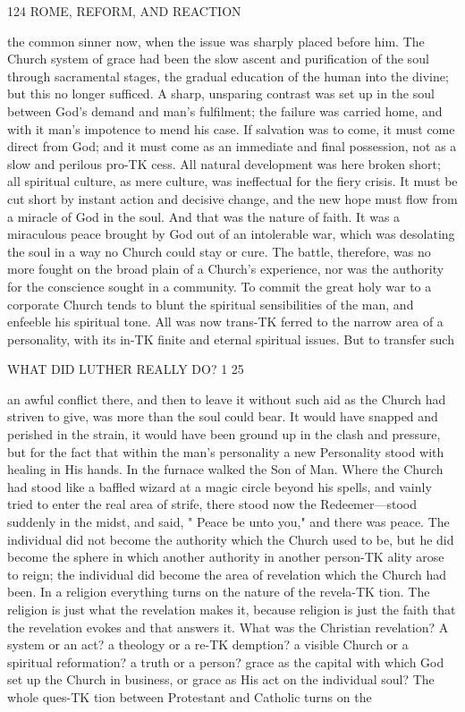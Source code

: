 \documentclass[12pt,a5paper,oneside]{book}
\begin{document}
124 ROME, REFORM, AND REACTION 

the common sinner now, when the issue was sharply 
placed before him. The Church system of grace had 
been the slow ascent and purification of the soul through 
sacramental stages, the gradual education of the human 
into the divine; but this no longer sufficed. A sharp, 
unsparing contrast was set up in the soul between 
God's demand and man's fulfilment; the failure was 
carried home, and with it man's impotence to mend 
his case. If salvation was to come, it must come 
direct from God; and it must come as an immediate 
and final possession, not as a slow and perilous pro-TK
cess. All natural development was here broken short; 
all spiritual culture, as mere culture, was ineffectual 
for the fiery crisis. It must be cut short by instant 
action and decisive change, and the new hope must 
flow from a miracle of God in the soul. And that 
was the nature of faith. It was a miraculous peace 
brought by God out of an intolerable war, which was 
desolating the soul in a way no Church could stay or 
cure. The battle, therefore, was no more fought on 
the broad plain of a Church's experience, nor was the 
authority for the conscience sought in a community. 
To commit the great holy war to a corporate Church 
tends to blunt the spiritual sensibilities of the man, 
and enfeeble his spiritual tone. All was now trans-TK
ferred to the narrow area of a personality, with its in-TK
finite and eternal spiritual issues. But to transfer such 



WHAT DID LUTHER REALLY DO? 1 25 

an awful conflict there, and then to leave it without 
such aid as the Church had striven to give, was more 
than the soul could bear. It would have snapped and 
perished in the strain, it would have been ground 
up in the clash and pressure, but for the fact that 
within the man's personality a new Personality stood 
with healing in His hands. In the furnace walked 
the Son of Man. Where the Church had stood like 
a baffled wizard at a magic circle beyond his spells, 
and vainly tried to enter the real area of strife, there 
stood now the Redeemer---stood suddenly in the 
midst, and said, " Peace be unto you," and there was 
peace. The individual did not become the authority 
which the Church used to be, but he did become the 
sphere in which another authority in another person-TK
ality arose to reign; the individual did become the 
area of revelation which the Church had been. In 
a religion everything turns on the nature of the revela-TK
tion. The religion is just what the revelation makes 
it, because religion is just the faith that the revelation 
evokes and that answers it. What was the Christian 
revelation? A system or an act? a theology or a re-TK
demption? a visible Church or a spiritual reformation? 
a truth or a person? grace as the capital with which 
God set up the Church in business, or grace as 
His act on the individual soul? The whole ques-TK
tion between Protestant and Catholic turns on the 
\end{document}
